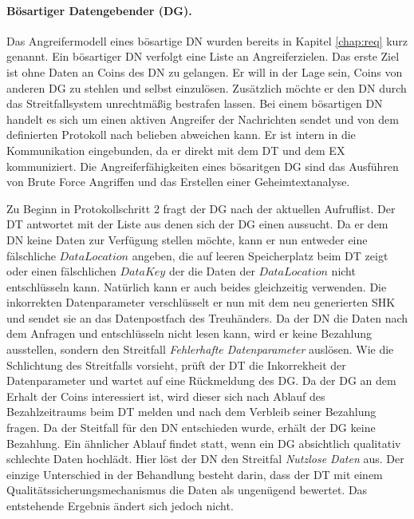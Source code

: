 \documentclass[
	fontsize=11pt,
	headings=small,
	parskip=half,           %
	bibliography=totoc,
	numbers=noenddot,       %
	open=any,               %
]{scrreprt}
\begin{document}
\paragraph{Bösartiger Datengebender (DG).}
Das Angreifermodell eines bösartige DN wurden bereits in Kapitel \ref{chap:req} kurz genannt. Ein bösartiger DN verfolgt eine Liste an Angreiferzielen. Das erste Ziel ist ohne Daten an Coins des DN zu gelangen. Er will in der Lage sein, Coins von anderen DG zu stehlen und selbst einzulösen. Zusätzlich möchte er den DN durch das Streitfallsystem unrechtmäßig bestrafen lassen. Bei einem bösartigen DN handelt es sich um einen aktiven Angreifer der Nachrichten sendet und von dem definierten Protokoll nach belieben abweichen kann. Er ist intern in die Kommunikation eingebunden, da er direkt mit dem DT und dem EX kommuniziert. Die Angreiferfähigkeiten eines bösaritgen DG sind das Ausführen von Brute Force Angriffen und das Erstellen einer Geheimtextanalyse.

Zu Beginn in Protokollschritt 2 fragt der DG nach der aktuellen Aufruflist. Der DT antwortet mit der Liste aus denen sich der DG einen aussucht. Da er dem DN keine Daten zur Verfügung stellen möchte, kann er nun entweder eine fälschliche $DataLocation$ angeben, die auf leeren Speicherplatz beim DT zeigt oder einen fälschlichen $DataKey$ der die Daten der $DataLocation$ nicht entschlüsseln kann. Natürlich kann er auch beides gleichzeitig verwenden. Die inkorrekten Datenparameter verschlüsselt er nun mit dem neu generierten SHK und sendet sie an das Datenpostfach des Treuhänders. Da der DN die Daten nach dem Anfragen und entschlüsseln nicht lesen kann, wird er keine Bezahlung ausstellen, sondern den Streitfall \textit{Fehlerhafte Datenparameter} auslösen. Wie die Schlichtung des Streitfalls vorsieht, prüft der DT die Inkorrekheit der Datenparameter und wartet auf eine Rückmeldung des DG. Da der DG an dem Erhalt der Coins interessiert ist, wird dieser sich nach Ablauf des Bezahlzeitraums beim DT melden und nach dem Verbleib seiner Bezahlung fragen. Da der Steitfall für den DN entschieden wurde, erhält der DG keine Bezahlung. Ein ähnlicher Ablauf findet statt, wenn ein DG absichtlich qualitativ schlechte Daten hochlädt. Hier löst der DN den Streitfal \textit{Nutzlose Daten} aus. Der einzige Unterschied in der Behandlung besteht darin, dass der DT mit einem Qualitätssicherungsmechanismus die Daten als ungenügend bewertet. Das entstehende Ergebnis ändert sich jedoch nicht.
\end{document}
